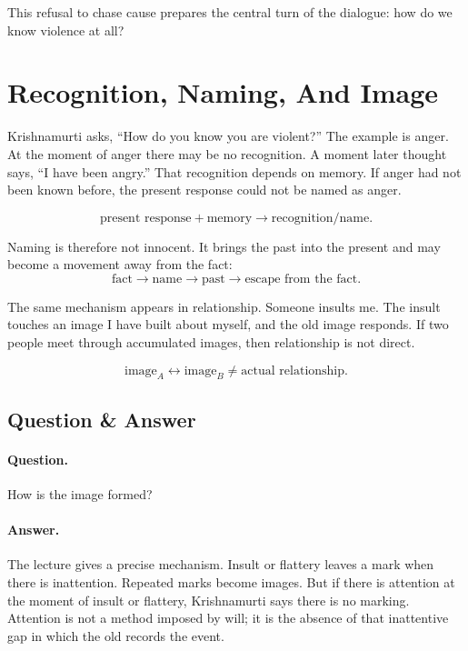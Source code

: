 \documentclass[11pt,oneside]{book}
\begin{document}
This refusal to chase cause prepares the central turn of the dialogue: how do we know violence at all?

\section{Recognition, Naming, And Image}

Krishnamurti asks, ``How do you know you are violent?'' The example is anger. At the moment of anger there may be no recognition. A moment later thought says, ``I have been angry.'' That recognition depends on memory. If anger had not been known before, the present response could not be named as anger.

\begin{equation}
\text{present response}+\text{memory}
\longrightarrow
\text{recognition/name}.
\end{equation}

Naming is therefore not innocent. It brings the past into the present and may become a movement away from the fact:
\begin{equation}
\text{fact}
\longrightarrow
\text{name}
\longrightarrow
\text{past}
\longrightarrow
\text{escape from the fact}.
\end{equation}

The same mechanism appears in relationship. Someone insults me. The insult touches an image I have built about myself, and the old image responds. If two people meet through accumulated images, then relationship is not direct.

\begin{equation}
\text{image}_A \leftrightarrow \text{image}_B
\neq
\text{actual relationship}.
\end{equation}

\subsection{Question \& Answer}

\paragraph{Question.}
How is the image formed?

\paragraph{Answer.}
The lecture gives a precise mechanism. Insult or flattery leaves a mark when there is inattention. Repeated marks become images. But if there is attention at the moment of insult or flattery, Krishnamurti says there is no marking. Attention is not a method imposed by will; it is the absence of that inattentive gap in which the old records the event.
\end{document}
